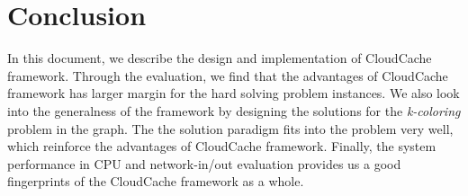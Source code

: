 \section{Conclusion}\label{sec:conclusion}
In this document, we describe the design and implementation of CloudCache framework. Through the evaluation, we find that the advantages of CloudCache framework has larger margin for the hard solving problem instances. We also look into the generalness of the framework by designing the solutions for the \emph{k-coloring} problem in the graph. The the solution paradigm fits into the problem very well, which reinforce the advantages of CloudCache framework. Finally, the system performance in CPU and network-in/out evaluation provides us a good fingerprints of the CloudCache framework as a whole.

